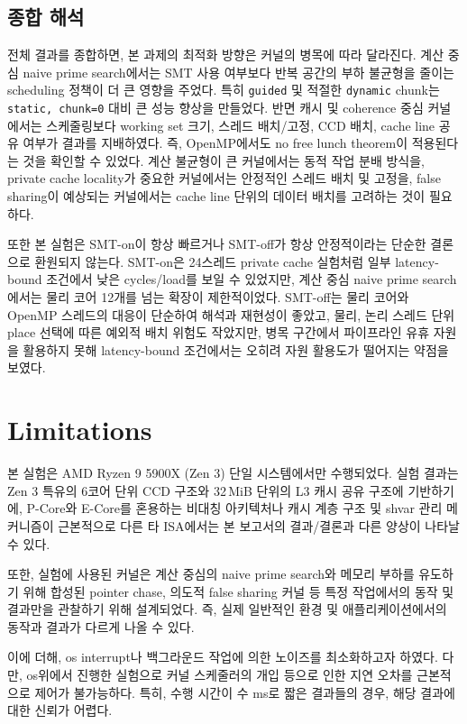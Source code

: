 \documentclass[11pt,a4paper]{article}
\begin{document}
\subsection{종합 해석}

전체 결과를 종합하면, 본 과제의 최적화 방향은 커널의 병목에 따라 달라진다. 계산 중심 naive prime search에서는 SMT 사용 여부보다 반복 공간의 부하 불균형을 줄이는 scheduling 정책이 더 큰 영향을 주었다. 특히 \texttt{guided} 및 적절한 \texttt{dynamic} chunk는 \texttt{static, chunk=0} 대비 큰 성능 향상을 만들었다. 반면 캐시 및 coherence 중심 커널에서는 스케줄링보다 working set 크기, 스레드 배치/고정, CCD 배치, cache line 공유 여부가 결과를 지배하였다. 즉, OpenMP에서도 no free lunch theorem이 적용된다는 것을 확인할 수 있었다. 계산 불균형이 큰 커널에서는 동적 작업 분배 방식을, private cache locality가 중요한 커널에서는 안정적인 스레드 배치 및 고정을, false sharing이 예상되는 커널에서는 cache line 단위의 데이터 배치를 고려하는 것이 필요하다.

또한 본 실험은 SMT-on이 항상 빠르거나 SMT-off가 항상 안정적이라는 단순한 결론으로 환원되지 않는다. SMT-on은 24스레드 private cache 실험처럼 일부 latency-bound 조건에서 낮은 cycles/load를 보일 수 있었지만, 계산 중심 naive prime search에서는 물리 코어 12개를 넘는 확장이 제한적이었다. SMT-off는 물리 코어와 OpenMP 스레드의 대응이 단순하여 해석과 재현성이 좋았고, 물리, 논리 스레드 단위 place 선택에 따른 예외적 배치 위험도 작았지만, 병목 구간에서 파이프라인 유휴 자원을 활용하지 못해 latency-bound 조건에서는 오히려 자원 활용도가 떨어지는 약점을 보였다.

\section{Limitations}

본 실험은 AMD Ryzen 9 5900X (Zen 3) 단일 시스템에서만 수행되었다. 실험 결과는 Zen 3 특유의 6코어 단위 CCD 구조와 32\,MiB 단위의 L3 캐시 공유 구조에 기반하기에, P-Core와 E-Core를 혼용하는 비대칭 아키텍처나 캐시 계층 구조 및 shvar 관리 메커니즘이 근본적으로 다른 타 ISA에서는 본 보고서의 결과/결론과 다른 양상이 나타날 수 있다.

또한, 실험에 사용된 커널은 계산 중심의 naive prime search와 메모리 부하를 유도하기 위해 합성된 pointer chase, 의도적 false sharing 커널 등 특정 작업에서의 동작 및 결과만을 관찰하기 위해 설계되었다. 즉, 실제 일반적인 환경 및 애플리케이션에서의 동작과 결과가 다르게 나올 수 있다.

이에 더해, os interrupt나 백그라운드 작업에 의한 노이즈를 최소화하고자 하였다. 다만, os위에서 진행한 실험으로 커널 스케줄러의 개입 등으로 인한 지연 오차를 근본적으로 제어가 불가능하다. 특히, 수행 시간이 수 ms로 짧은 결과들의 경우, 해당 결과에 대한 신뢰가 어렵다.
\end{document}
